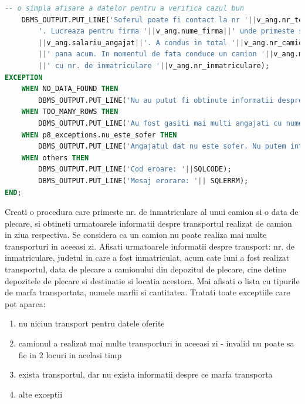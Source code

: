 \documentclass[12pt, a4paper]{article}
\begin{document}
\begin{lstlisting}[language=SQL]
-- o simpla afisare a datelor pentru a verifica cazul bun    
    DBMS_OUTPUT.PUT_LINE('Soferul poate fi contact la nr '||v_ang.nr_telefon_ang||
        '. Lucreaza pentru firma '||v_ang.nume_firma||' unde primeste salariul de '
        ||v_ang.salariu_angajat||'. A condus in total '||v_ang.nr_camioane_conduse
        ||' pana acum. In momentul de fata conduce un camion '||v_ang.marca_camion
        ||' cu nr. de inmatriculare '||v_ang.nr_inmatriculare);
EXCEPTION
    WHEN NO_DATA_FOUND THEN
        DBMS_OUTPUT.PUT_LINE('Nu au putut fi obtinute informatii despre soferul dat');
    WHEN TOO_MANY_ROWS THEN 
        DBMS_OUTPUT.PUT_LINE('Au fost gasiti mai multi angajati cu numele dat');
    WHEN p8_exceptions.nu_este_sofer THEN
        DBMS_OUTPUT.PUT_LINE('Angajatul dat nu este sofer. Nu putem intoarce informatii despre el.');
    WHEN others THEN
        DBMS_OUTPUT.PUT_LINE('Cod eroare: '||SQLCODE);
        DBMS_OUTPUT.PUT_LINE('Mesaj erorare: '|| SQLERRM);
END;
\end{lstlisting}

Creati o procedura care primeste nr. de inmatriculare al unui camion si o
data de plecare, si obtineti urmatoarele informatii despre transportul
realizat de camion in ziua respectiva. Se considera ca un camion nu poate
realiza mai multe transporturi in aceeasi zi. Afisati urmatoarele informatii
despre transport: nr. de inmatriculare, judetul in care a fost inmatriculat,
acum cate luni a fost realizat transportul, data de plecare a camionului din
depozitul de plecare, cine detine depozitele de plecare si destinatie si
locatia acestora. Mai afisati o lista cu tipurile de marfa transportata,
numele marfii si cantitatea. Tratati toate exceptiile care pot aparea:
\begin{enumerate}
    \item nu niciun transport pentru datele oferite
    \item camionul a realizat mai multe transporturi in aceeasi zi - invalid nu
          poate sa fie in 2 locuri in acelasi timp
    \item exista transportul, dar nu exista informatii despre ce marfa transporta
    \item alte exceptii
\end{enumerate}
\end{document}
